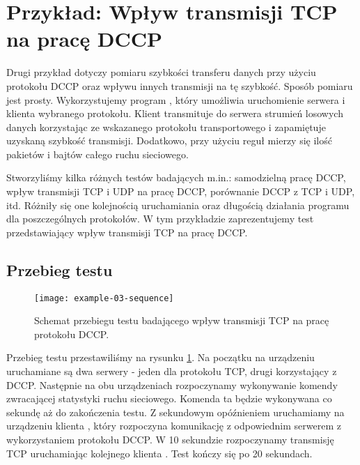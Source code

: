\documentclass[00-praca-magisterska.tex]{subfiles}
\begin{document}
\section{Przykład: Wpływ transmisji TCP na pracę DCCP}
\label{example-dccp}

Drugi przykład dotyczy pomiaru szybkości transferu danych przy użyciu protokołu
DCCP oraz wpływu innych transmisji na tę szybkość. Sposób pomiaru jest prosty.
Wykorzystujemy program , który umożliwia uruchomienie serwera i
klienta wybranego protokołu. Klient transmituje do serwera strumień losowych
danych korzystając ze wskazanego protokołu transportowego i zapamiętuje uzyskaną
szybkość transmisji. Dodatkowo, przy użyciu reguł  mierzy się
ilość pakietów i bajtów całego ruchu sieciowego.

Stworzyliśmy kilka różnych testów badających m.in.: samodzielną pracę DCCP,
wpływ transmisji TCP i UDP na pracę DCCP, porównanie DCCP z TCP i UDP, itd.
Różniły się one kolejnością uruchamiania oraz długością działania programu
 dla poszczególnych protokołów. W tym przykładzie zaprezentujemy
test przedstawiający wpływ transmisji TCP na pracę DCCP. 

\subsection{Przebieg testu}

\begin{figure}[htb]
\begin{center}
\leavevmode
\texttt{[image: example-03-sequence]}
\end{center}
\caption{Schemat przebiegu testu badającego wpływ transmisji TCP na pracę
protokołu DCCP.}
\label{fig:example-03-sequence}
\end{figure}

Przebieg testu przestawiliśmy na rysunku \ref{fig:example-03-sequence}. Na
początku na urządzeniu  uruchamiane są dwa serwery  -
jeden dla protokołu TCP, drugi korzystający z DCCP. Następnie na obu
urządzeniach rozpoczynamy wykonywanie komendy  zwracającej
statystyki ruchu sieciowego. Komenda ta będzie wykonywana co sekundę aż do
zakończenia testu. Z sekundowym opóźnieniem uruchamiamy na urządzeniu
 klienta , który rozpoczyna komunikację z odpowiednim
serwerem z wykorzystaniem protokołu DCCP. W 10 sekundzie rozpoczynamy transmisję
TCP uruchamiając kolejnego klienta . Test kończy się po 20
sekundach.
\end{document}
